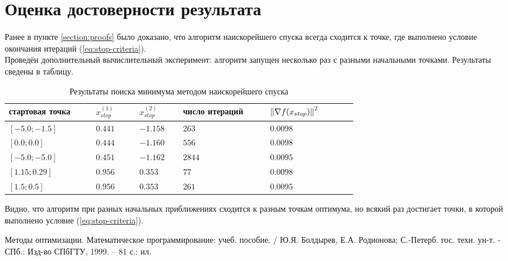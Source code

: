 \documentclass[main.tex]{subfiles}
\begin{document}
\section{Оценка достоверности результата}
Ранее в пункте \ref{section:proofs} было доказано, что алгоритм наискорейшего спуска всегда сходится к точке, где выполнено условие окончания итераций (\ref{eq:stop-criteria}). \\
Проведён дополнительный вычислительный эксперимент: алгоритм запущен несколько раз с разными начальными точками. Результаты сведены в таблицу.

\begin{table}[h]
	\label{table:results}
	\caption{Результаты поиска минимума методом наискорейшего спуска}
\begin{center}
	\begin{tabular} { | p{0.2\linewidth} | p{0.1\linewidth} | p{0.1\linewidth} | p{0.2\linewidth} | p{0.2\linewidth} |}
		\hline
стартовая точка& $x_{stop}^{(1)}$ & $x_{stop}^{(2)}$ & число итераций  &  $ \left\lVert\nabla f(x_{stop})\right\rVert ^2 $   \\ \hline
		$[-5.0; -1.5]$ & $0.441$ & $-1.158$ & $263$  & $0.0098$  \\ \hline
		$[0.0; 0.0]$ & $0.444$ & $-1.160$ & $556$  & $0.0098$  \\ \hline
		$[-5.0; -5.0]$ & $0.451$ & $-1.162$ & $2844$  & $0.0095$  \\ \hline
		$[1.15; 0.29]$ & $0.956$ & $0.353$ & $77$  & $0.0098$  \\ \hline
		$[1.5; 0.5]$ & $0.956$ & $0.353$ & $261$  & $0.0095$  \\ \hline
	\end{tabular}
\end{center}
Видно, что алгоритм при разных начальных приближениях сходится к разным точкам оптимума, но всякий раз достигает точки, в которой выполнено условие (\ref{eq:stop-criteria}).
\end{table}


\begin{thebibliography}{99}
	 Методы оптимизации. Математическое программирование: учеб. пособие. / Ю.Я. Болдырев, Е.А. Родионова; С.-Петерб. гос. техн. ун-т. - СПб.: Изд-во СПбГТУ, 1999. -- 81 с.: ил.
\end{thebibliography}
\end{document}
